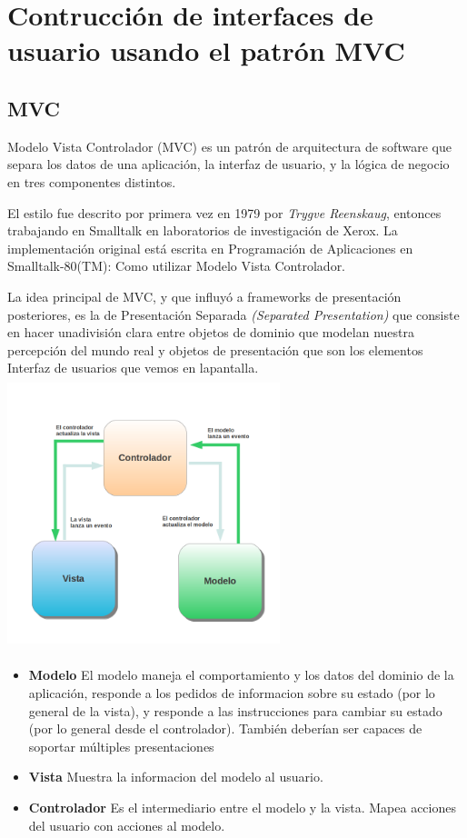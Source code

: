 \section{Contrucción de interfaces de usuario usando el patrón MVC}

\subsection{MVC}

Modelo Vista Controlador (MVC) es un patrón de arquitectura de software que
separa los datos de una aplicación, la interfaz de usuario, y la lógica de
negocio en tres componentes distintos.

El estilo fue descrito por primera vez en 1979 por \emph{Trygve Reenskaug},
entonces trabajando en Smalltalk en laboratorios de investigación de Xerox. 
La implementación original está escrita en Programación de Aplicaciones en 
Smalltalk-80(TM): Como utilizar Modelo Vista Controlador.

La idea principal de MVC, y que influyó a frameworks de presentación posteriores,
es la de Presentación Separada \emph{(Separated Presentation)} que consiste en
hacer unadivisión clara entre objetos de dominio que modelan nuestra percepción 
del mundo real y objetos de presentación que son los elementos Interfaz de
usuarios que vemos en lapantalla.\\

\includegraphics[width=300px, height=300px]{img/mvc}

\begin {itemize}


  	

\item {\bf Modelo}
	El modelo maneja el comportamiento y los datos del dominio de la aplicación,
	responde a los pedidos de informacion sobre su estado (por lo general de la
	vista), y responde a las instrucciones para cambiar su estado (por lo general
	desde el controlador). También deberían ser capaces de soportar	múltiples presentaciones
	
	
\item {\bf Vista}
	Muestra la informacion del modelo al usuario. 
	
\item {\bf Controlador}
	Es el intermediario entre el modelo y la vista.
	Mapea acciones del usuario con acciones al modelo.
		
	
\end {itemize}

